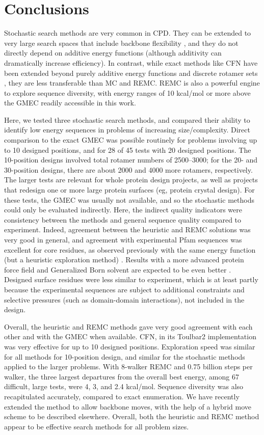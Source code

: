 \documentclass[a4paper,12pt]{article}
\begin{document}
\section{Conclusions}
Stochastic search methods are very common in CPD. They can be extended to very large search spaces that include
backbone flexibility \cite{Fung08,Mandell09,Huang11}, and they do not directly depend on additive energy functions
(although additivity can dramatically increase efficiency). In contrast, while exact methods like CFN have been extended
beyond purely additive energy functions \cite{Ng11,Lucore15} and discrete rotamer sets \cite{Georgiev08,Hallen15},
they are less transferable than MC and REMC. REMC is also a powerful engine to explore sequence diversity, with energy
ranges of 10 kcal/mol or more above the GMEC readily accessible in this work.

Here, we tested three stochastic search methods, and compared their ability to identify low energy sequences in problems
of increasing size/complexity. Direct comparison to the exact GMEC was possible routinely for problems involving up to
10 designed positions, and for 28 of 45 tests with 20 designed positions. The 10-position designs involved total rotamer
numbers of 2500--3000; for the 20- and 30-position designs, there are about 2000 and 4000 more rotamers, respectively.
The larger tests are relevant for whole protein design projects, as well as projects that redesign one or more large
protein surfaces (eg, protein crystal design). For these tests, the GMEC was usually not available, and so the stochastic
methods could only be evaluated indirectly. Here, the indirect quality indicators were consistency between the methods
and general sequence quality compared to experiment. Indeed, agreement between the heuristic and REMC solutions was very
good in general, and agreement with experimental Pfam sequences was excellent for core residues, as observed previously
with the same energy function (but a heuristic exploration method) \cite{Schmidt09,Schmidt10}. Results with a more
advanced protein force field and Generalized Born solvent are expected to be even better \cite{Polydorides11,Simonson15}.
Designed surface residues were less similar to experiment, which is at least partly because the experimental sequences
are subject to additional constraints and selective pressures (such as domain-domain interactions), not included in the
design.  

Overall, the heuristic and REMC methods gave very good agreement with each other and with the GMEC when available.
CFN, in its Toulbar2 implementation was very effective for up to 10 designed positions. Exploration speed was similar
for all methods for 10-position design, and similar for the stochastic methods applied to the larger problems. With
8-walker REMC and 0.75 billion steps per walker, the three largest departures from the overall best energy, among 67
difficult, large tests, were 4, 3, and 2.4 kcal/mol. Sequence diversity was also recapitulated accurately, compared to
exact enumeration. We have recently extended the method to allow backbone moves, with the help of a hybrid move
scheme to be described elsewhere. Overall, both the heuristic and REMC method appear to be effective search methods
for all problem sizes.
\end{document}
